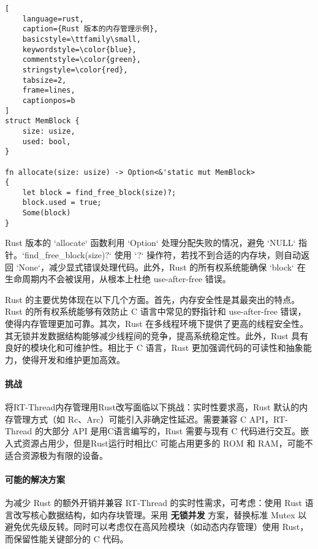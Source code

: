 \documentclass{ctexart}
\begin{document}
\begin{lstlisting}[
    language=rust,
    caption={Rust 版本的内存管理示例},
    basicstyle=\ttfamily\small,
    keywordstyle=\color{blue},
    commentstyle=\color{green},
    stringstyle=\color{red},
    tabsize=2,
    frame=lines,
    captionpos=b
]
struct MemBlock {
    size: usize,
    used: bool,
}

fn allocate(size: usize) -> Option<&'static mut MemBlock>
{
    let block = find_free_block(size)?;
    block.used = true;
    Some(block)
}
\end{lstlisting}

Rust 版本的 `allocate` 函数利用 `Option` 处理分配失败的情况，避免 `NULL` 指针。`find\_free\_block(size)?` 使用 `?` 操作符，若找不到合适的内存块，则自动返回 `None`，减少显式错误处理代码。此外，Rust 的所有权系统能确保 `block` 在生命周期内不会被误用，从根本上杜绝 use-after-free 错误。

Rust 的主要优势体现在以下几个方面。首先，内存安全性是其最突出的特点。Rust 的所有权系统能够有效防止 C 语言中常见的野指针和 use-after-free 错误，使得内存管理更加可靠。其次，Rust 在多线程环境下提供了更高的线程安全性。其无锁并发数据结构能够减少线程间的竞争，提高系统稳定性。此外，Rust 具有良好的模块化和可维护性。相比于 C 语言，Rust 更加强调代码的可读性和抽象能力，使得开发和维护更加高效。

\paragraph{挑战}
将RT-Thread内存管理用Rust改写面临以下挑战：实时性要求高，Rust 默认的内存管理方式（如 Rc、Arc）可能引入非确定性延迟。需要兼容 C API，RT-Thread 的大部分 API 是用C语言编写的，Rust 需要与现有 C 代码进行交互。嵌入式资源占用少，但是Rust运行时相比C 可能占用更多的 ROM 和 RAM，可能不适合资源极为有限的设备。

\paragraph{可能的解决方案}
为减少 Rust 的额外开销并兼容 RT-Thread 的实时性需求，可考虑：使用 Rust 语言改写核心数据结构，如内存块管理。采用 \textbf{无锁并发} 方案，替换标准 Mutex 以避免优先级反转。同时可以考虑仅在高风险模块（如动态内存管理）使用 Rust，而保留性能关键部分的 C 代码。
\end{document}
